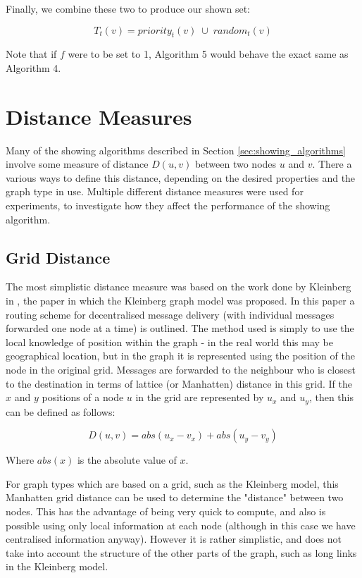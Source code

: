 \documentclass[bsc,frontabs,twoside,singlespacing,parskip,deptreport]{infthesis}     %
\begin{document}
Finally, we combine these two to produce our shown set:

\begin{equation}
T_{t}(v) = priority_{t}(v) \; \cup \; random_{t}(v)
\end{equation}

Note that if $f$ were to be set to 1, Algorithm 5 would behave the exact same as Algorithm 4.


\section{Distance Measures} \label{sec:distance_measures}
Many of the showing algorithms described in Section \ref{sec:showing_algorithms} involve some measure of distance $D(u, v)$ between two nodes $u$ and $v$. There a various ways to define this distance, depending on the desired properties and the graph type in use. Multiple different distance measures were used for experiments, to investigate how they affect the performance of the showing algorithm.

\subsection{Grid Distance}
The most simplistic distance measure was based on the work done by Kleinberg in \cite{Kleinberg00}, the paper in which the Kleinberg graph model was proposed. In this paper a routing scheme for decentralised message delivery (with individual messages forwarded one node at a time) is outlined. The method used is simply to use the local knowledge of position within the graph - in the real world this may be geographical location, but in the graph it is represented using the position of the node in the original grid. Messages are forwarded to the neighbour who is closest to the destination in terms of lattice (or Manhatten) distance in this grid. If the $x$ and $y$ positions of a node $u$ in the grid are represented by $u_{x}$ and $u_{y}$, then this can be defined as follows:

\begin{equation}
D(u, v) = abs(u_{x} - v_{x}) + abs(u_{y} - v_{y})
\end{equation}

Where $abs(x)$ is the absolute value of $x$.

For graph types which are based on a grid, such as the Kleinberg model, this Manhatten grid distance can be used to determine the "distance" between two nodes. This has the advantage of being very quick to compute, and also is possible using only local information at each node (although in this case we have centralised information anyway). However it is rather simplistic, and does not take into account the structure of the other parts of the graph, such as long links in the Kleinberg model.
\end{document}
